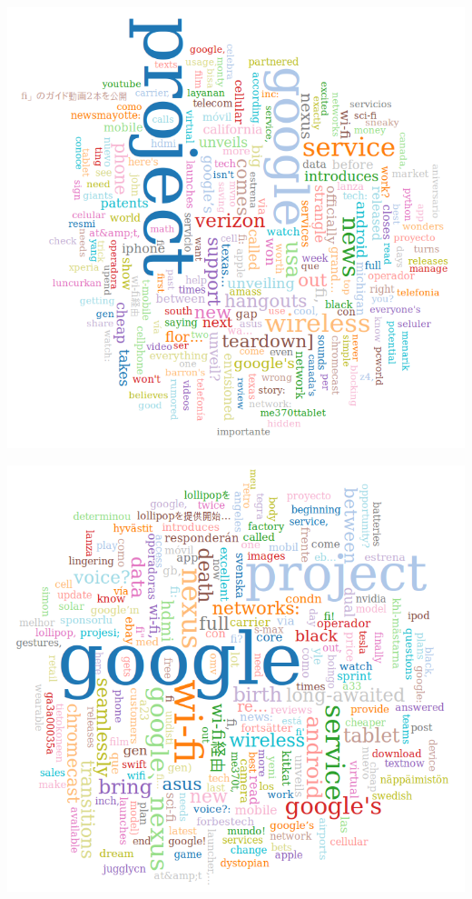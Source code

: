 	\begin{minipage}{\linewidth}
		\centering
			\includegraphics[scale=0.55]{figures/q4/wordCloudDay3}
		\label{wordCount}
	\end{minipage}
	
	\begin{minipage}{\linewidth}
		\centering
			\includegraphics[scale=0.55]{figures/q4/wordCloudDay4}
		\label{wordCount}
	\end{minipage}

